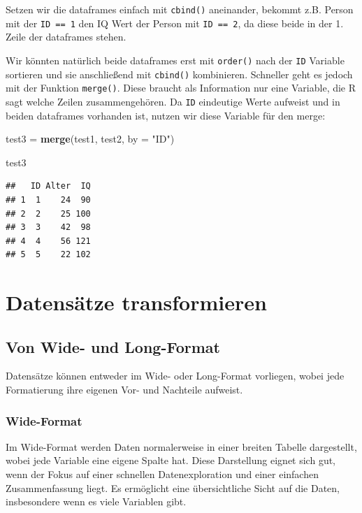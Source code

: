 \documentclass[
]{book}
\newenvironment{Shaded}{\begin{snugshade}}{\end{snugshade}}
\newcommand{\AttributeTok}[1]{\textcolor[rgb]{0.13,0.29,0.53}{#1}}
\newcommand{\FunctionTok}[1]{\textcolor[rgb]{0.13,0.29,0.53}{\textbf{#1}}}
\newcommand{\NormalTok}[1]{#1}
\newcommand{\OtherTok}[1]{\textcolor[rgb]{0.56,0.35,0.01}{#1}}
\newcommand{\StringTok}[1]{\textcolor[rgb]{0.31,0.60,0.02}{#1}}
\begin{document}
Setzen wir die dataframes einfach mit \texttt{cbind()} aneinander, bekommt z.B. Person mit der \texttt{ID\ ==\ 1} den IQ Wert der Person mit \texttt{ID\ ==\ 2}, da diese beide in der 1. Zeile der dataframes stehen.

Wir könnten natürlich beide dataframes erst mit \texttt{order()} nach der \texttt{ID} Variable sortieren und sie anschließend mit \texttt{cbind()} kombinieren. Schneller geht es jedoch mit der Funktion \texttt{merge()}. Diese braucht als Information nur eine Variable, die R sagt welche Zeilen zusammengehören. Da \texttt{ID} eindeutige Werte aufweist und in beiden dataframes vorhanden ist, nutzen wir diese Variable für den merge:

\begin{Shaded}
\begin{Highlighting}[]
\NormalTok{test3 }\OtherTok{=} \FunctionTok{merge}\NormalTok{(test1, test2, }\AttributeTok{by =} \StringTok{"ID"}\NormalTok{)}

\NormalTok{test3}
\end{Highlighting}
\end{Shaded}

\begin{verbatim}
##   ID Alter  IQ
## 1  1    24  90
## 2  2    25 100
## 3  3    42  98
## 4  4    56 121
## 5  5    22 102
\end{verbatim}

\section{Datensätze transformieren}\label{datensuxe4tze-transformieren}

\subsection{Von Wide- und Long-Format}\label{von-wide--und-long-format}

Datensätze können entweder im Wide- oder Long-Format vorliegen, wobei jede Formatierung ihre eigenen Vor- und Nachteile aufweist.

\subsubsection{Wide-Format}\label{wide-format}

Im Wide-Format werden Daten normalerweise in einer breiten Tabelle dargestellt, wobei jede Variable eine eigene Spalte hat. Diese Darstellung eignet sich gut, wenn der Fokus auf einer schnellen Datenexploration und einer einfachen Zusammenfassung liegt. Es ermöglicht eine übersichtliche Sicht auf die Daten, insbesondere wenn es viele Variablen gibt.
\end{document}

